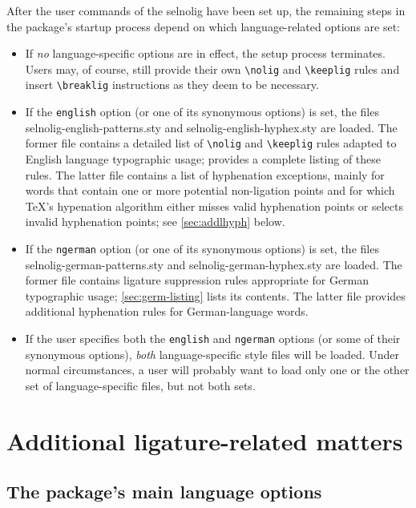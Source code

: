 \documentclass[11pt]{article}
\newcommand{\pkg}[1]{\textsf{#1}}
\newcommand{\opt}[1]{\texttt{#1}}
\newcommand{\cmmd}[1]{\texttt{\textbackslash #1}}
\begin{document}
After the user commands of the \pkg{selnolig} have been set up, the remaining steps in the package's startup process depend on which language-related options are set:
\begin{itemize}
\item If \emph{no} language-specific options are in effect, the setup process terminates. Users may, of course, still provide their own \cmmd{nolig} and \cmmd{keeplig} rules and insert \cmmd{breaklig} instructions as they deem to be necessary.

\item If the \opt{english} option (or one of its synonymous options) is set, the files \pkg{selnolig-english-patterns.sty} and \pkg{selnolig-english-hyphex.sty} are loaded. The former file contains a detailed list of \cmmd{nolig} and \cmmd{keeplig} rules adapted to English language typographic usage;  provides a complete listing of these rules. The latter file contains a list of hyphenation exceptions, mainly for words that contain one or more potential non-ligation points and for which \TeX's hypenation algorithm either misses valid hyphenation points or selects invalid hyphenation points; see \cref{sec:addlhyph} below.

\item If the \opt{ngerman} option (or one of its synonymous options) is set, the files \pkg{selnolig-german-patterns.sty} and \pkg{selnolig-german-hyphex.sty} are loaded. The former file contains ligature suppression rules appropriate for German typographic usage; \cref{sec:germ-listing} lists its contents. The latter file provides additional hyphenation rules for German-language words.

\item If the user specifies both the \opt{english} and \opt{ngerman} options (or some of their synonymous options), \emph{both} language-specific style files will be loaded. Under normal circumstances, a user will probably want to load only one or the other set of language-specific files, but not both sets.
\end{itemize}



\section{Additional ligature-related matters}
\label{sec:options}


\subsection{The package's main language options}
\end{document}

